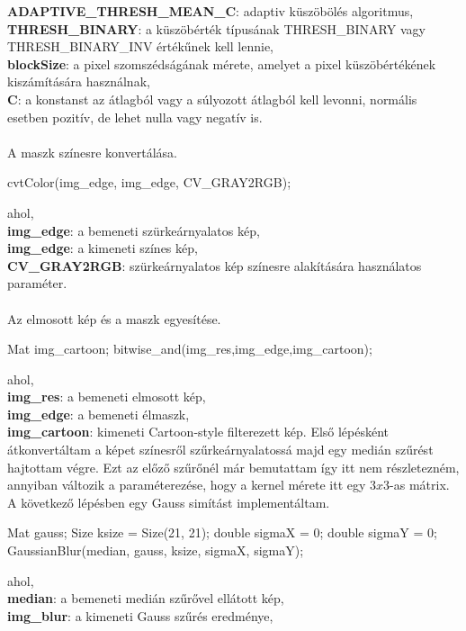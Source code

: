 \indent \textbf{ADAPTIVE\_THRESH\_MEAN\_C}: adaptiv küszöbölés algoritmus,\\
\indent \textbf{THRESH\_BINARY}: a küszöbérték típusának THRESH\_BINARY vagy THRESH\_BINARY\_INV értékűnek kell lennie,\\
\indent \textbf{blockSize}: a pixel szomszédságának mérete, amelyet a pixel küszöbértékének kiszámítására használnak,\\
\indent \textbf{C}: a konstanst az átlagból vagy a súlyozott átlagból kell levonni, normális esetben pozitív, de lehet nulla vagy negatív is.\\\\
A maszk színesre konvertálása.
\begin{cpp}
cvtColor(img_edge, img_edge, CV_GRAY2RGB);
\end{cpp}
ahol, \\
\indent \textbf{img\_edge}: a bemeneti szürkeárnyalatos kép,\\
\indent \textbf{img\_edge}: a kimeneti színes kép,\\
\indent \textbf{CV\_GRAY2RGB}: szürkeárnyalatos kép színesre alakítására használatos paraméter.\\ \\
Az elmosott kép és a maszk egyesítése. 
\begin{cpp}
Mat img_cartoon;
bitwise_and(img_res,img_edge,img_cartoon);
\end{cpp}
ahol, \\
\indent \textbf{img\_res}: a bemeneti elmosott kép,\\
\indent \textbf{img\_edge}: a bemeneti élmaszk,\\
\indent \textbf{img\_cartoon}: kimeneti Cartoon-style filterezett kép.
Első lépésként átkonvertáltam a képet színesről szűrkeárnyalatossá majd egy medián szűrést hajtottam végre. Ezt az előző szűrőnél már bemutattam így itt nem részletezném, annyiban változik a paraméterezése, hogy a kernel mérete itt egy $3 x 3$-as mátrix.\\
A következő lépésben egy Gauss simítást implementáltam. 
\begin{cpp}
Mat gauss;
Size ksize = Size(21, 21);
double sigmaX = 0;
double sigmaY = 0;
GaussianBlur(median, gauss, ksize, sigmaX, sigmaY);
\end{cpp}
ahol, \\
\indent \textbf{median}: a bemeneti medián szűrővel ellátott kép,\\
\indent \textbf{img\_blur}: a kimeneti Gauss szűrés eredménye,\\
